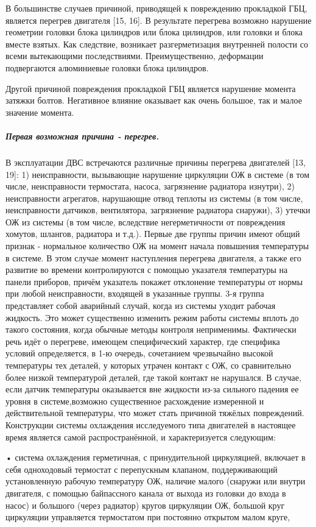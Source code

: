 В большинстве случаев причиной, приводящей к повреждению прокладкой ГБЦ, является  перегрев двигателя [15, 16]. В результате перегрева возможно нарушение геометрии головки блока цилиндров или блока цилиндров, или головки и блока вместе взятых.  Как следствие, возникает разгерметизация внутренней полости со всеми вытекающими последствиями. Преимущественно, деформации подвергаются алюминиевые  головки блока цилиндров.

Другой причиной повреждения прокладкой ГБЦ является нарушение момента затяжки болтов. Негативное влияние оказывает как очень большое, так и малое значение момента. 

\subparagraph{Первая возможная причина - перегрев.}
В эксплуатации ДВС встречаются различные  причины перегрева двигателей [13, 19]:
1)	неисправности, вызывающие нарушение циркуляции ОЖ в системе (в том числе, неисправности термостата, насоса, загрязнение радиатора изнутри),
2)	неисправности агрегатов, нарушающие отвод теплоты из системы (в том числе, неисправности датчиков, вентилятора, загрязнение радиатора снаружи),
3)	утечки ОЖ из системы (в том числе, вследствие негерметичности от повреждения хомутов, шлангов, радиатора и т.д.).
Первые две группы причин имеют общий признак - нормальное количество ОЖ на момент начала повышения температуры в системе. В этом случае момент наступления перегрева двигателя, а также его развитие во времени контролируются с помощью указателя температуры на панели приборов, причём указатель покажет отклонение температуры от нормы при любой неисправности, входящей в указанные группы.
3-я группа представляет собой аварийный случай, когда из системы уходит рабочая жидкость. Это может существенно изменить режим работы системы вплоть до такого состояния, когда обычные методы контроля неприменимы.
Фактически речь идёт о перегреве, имеющем специфический характер, где специфика условий определяется, в 1-ю очередь, сочетанием чрезвычайно высокой температуры тех деталей, у которых утрачен контакт с ОЖ, со сравнительно более низкой температурой деталей, где такой контакт не нарушался. В случае, если датчик температуры оказывается вне жидкости из-за сильного падения ее уровня в системе,возможно существенное расхождение измеренной и действительной температуры, что  может стать причиной тяжёлых повреждений.\\
Конструкции системы охлаждения  исследуемого типа двигателей в настоящее время является самой распространённой, и
характеризуется следующим:
 
• система охлаждения герметичная, с принудительной циркуляцией, включает в себя одноходовый термостат с перепускным клапаном, поддерживающий установленную рабочую температуру ОЖ, наличие малого (снаружи или внутри двигателя, с помощью байпассного канала от выхода из головки до входа в насос) и большого (через радиатор) кругов циркуляции ОЖ, 
большой круг циркуляции управляется термостатом при постоянно открытом малом круге,

